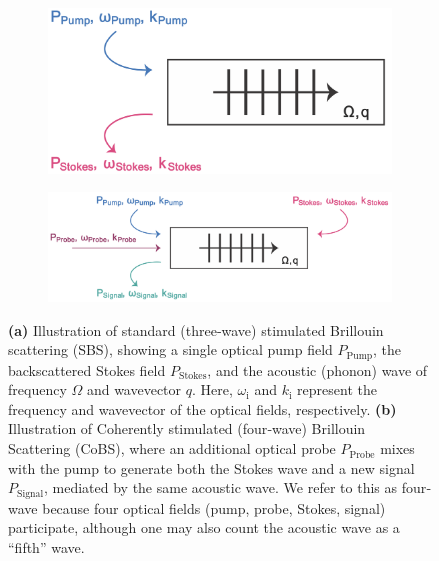 \begin{figure}[t]
    \centering
    \begin{subfigure}[b]{0.37\textwidth}
        \centering
        \includegraphics[width=\textwidth]{figs/3-CoBS/SBS Illustrator Diagram.png}
        \caption{}
        \label{fig:CoBS:SBSDiagram}
    \end{subfigure}
    \hfill
    \begin{subfigure}[b]{0.54\textwidth}
        \centering
        \includegraphics[width=\textwidth]{figs/3-CoBS/4-Wave-Brillouin-Scattering.png}
        \caption{}
        \label{fig:CoBS:4-Wave-Brillouin-Scattering}
    \end{subfigure}
    \caption[Illustrations of standard (three‐wave) stimulated Brillouin scattering and Coherently stimulated (four-wave) Brillouin Scattering (\acs{CoBS}).]{\textbf{(a)} Illustration of standard (three‐wave) stimulated Brillouin scattering (\acs{SBS}), showing a single optical pump field \(P_{\mathrm{Pump}}\), the backscattered Stokes field \(P_{\mathrm{Stokes}}\), and the acoustic (phonon) wave of frequency \(\Omega\) and wavevector \(q\). Here, \(\omega_{\mathrm{i}}\) and \(k_{\mathrm{i}}\) represent the frequency and wavevector of the optical fields, respectively. \textbf{(b)} Illustration of Coherently stimulated (four‐wave) Brillouin Scattering (\acs{CoBS}), where an additional optical probe \(P_{\mathrm{Probe}}\) mixes with the pump to generate both the Stokes wave and a new signal \(P_{\mathrm{Signal}}\), mediated by the same acoustic wave. We refer to this as four‐wave because four optical fields (pump, probe, Stokes, signal) participate, although one may also count the acoustic wave as a “fifth” wave.}
    \label{fig:CoBS:SBSvsCoBSDiagrams}
\end{figure}

